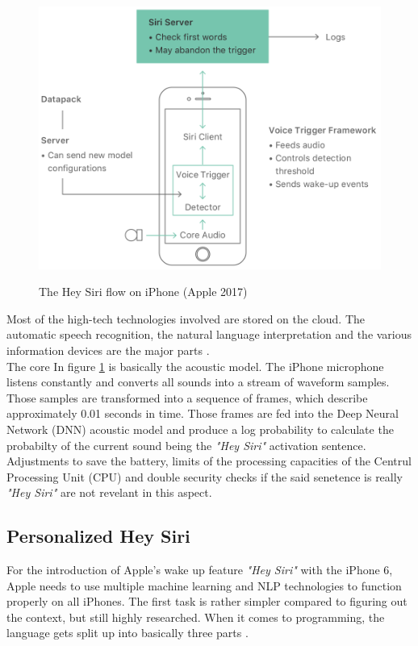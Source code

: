 \begin{figure}
  \begin{center}
  \includegraphics[width=4.5in]{photos/HeySiriFlow-1}\\
  \caption{The Hey Siri flow on iPhone (Apple 2017)\cite{siri1}}\label{flow}
  \end{center}
\end{figure}

Most of the high-tech technologies involved are stored on the cloud. The automatic speech recognition, the natural language interpretation and the various information devices are the major parts \cite{siri1}. \\
The core In figure \ref{flow} is basically the acoustic model. The iPhone microphone listens constantly and converts all sounds into a stream of waveform samples. Those samples are transformed into a sequence of frames, which describe approximately 0.01 seconds in time. Those frames are fed into the Deep Neural Network (DNN) acoustic model and produce a log probability to calculate the probabilty of the current sound being the \textit{"Hey Siri"} activation sentence. 
Adjustments to save the battery, limits of the processing capacities of the Centrul Processing Unit (CPU) and double security checks if the said senetence is really \textit{"Hey Siri"} are not revelant in this aspect.

\subsection{Personalized Hey Siri}
For the introduction of Apple's wake up feature \textit{"Hey Siri"} with the iPhone 6, Apple needs to use multiple machine learning and NLP technologies to function properly on all iPhones.
The first task is rather simpler compared to figuring out the context, but still highly researched. When it comes to programming, the language gets split up into basically three parts \cite{siri2}.

